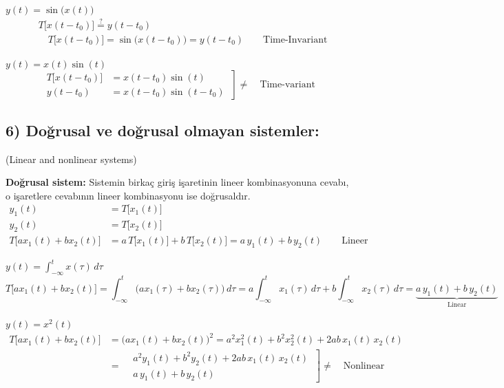 \documentclass[11pt,a4paper]{article}
\begin{document}
\begin{ornek}[(Ex)]
$y(t) = \sin\bigl(x(t)\bigr)$
\begin{align*}
  &T\bigl[x(t-t_0)\bigr] \overset{?}{=} y(t-t_0) \\
  &\quad T\bigl[x(t-t_0)\bigr] = \sin\bigl(x(t-t_0)\bigr) = y(t-t_0) \qquad \text{Time-Invariant}
\end{align*}
\end{ornek}

\begin{ornek}[(Ex)]
$y(t) = x(t)\sin(t)$
\[ \left.\begin{aligned}
  T\bigl[x(t-t_0)\bigr] &= x(t-t_0)\sin(t) \\
  y(t-t_0) &= x(t-t_0)\sin(t-t_0)
\end{aligned}\ \right]\neq \quad \text{Time-variant} \]
\end{ornek}

\subsection{6) Doğrusal ve doğrusal olmayan sistemler:}
(Linear and nonlinear systems)

\textbf{Doğrusal sistem:} Sistemin birkaç giriş işaretinin lineer kombinasyonuna cevabı, o işaretlere cevabının lineer kombinasyonu ise doğrusaldır.
\begin{align*}
  y_1(t) &= T\bigl[x_1(t)\bigr] \\
  y_2(t) &= T\bigl[x_2(t)\bigr] \\
  T\bigl[a x_1(t) + b x_2(t)\bigr] &= a\,T\bigl[x_1(t)\bigr] + b\,T\bigl[x_2(t)\bigr] = a\,y_1(t) + b\,y_2(t) \qquad \text{Lineer}
\end{align*}

\begin{ornek}[(Ex)]
$y(t) = \displaystyle\int_{-\infty}^{t} x(\tau)\,d\tau$
\[ T\bigl[a x_1(t) + b x_2(t)\bigr] = \int_{-\infty}^{t} \bigl(a x_1(\tau) + b x_2(\tau)\bigr)\,d\tau = a\int_{-\infty}^{t} x_1(\tau)\,d\tau + b\int_{-\infty}^{t} x_2(\tau)\,d\tau = \underbrace{a\,y_1(t) + b\,y_2(t)}_{\text{Linear}} \]
\end{ornek}

\begin{ornek}[(Ex)]
$y(t) = x^2(t)$
\begin{align*}
  T\bigl[a x_1(t) + b x_2(t)\bigr] &= \bigl(a x_1(t) + b x_2(t)\bigr)^2 = a^2 x_1^2(t) + b^2 x_2^2(t) + 2ab\,x_1(t)\,x_2(t) \\
  &= \left.\begin{aligned} &a^2 y_1(t) + b^2 y_2(t) + 2ab\,x_1(t)\,x_2(t) \\ &a\,y_1(t) + b\,y_2(t) \end{aligned}\ \right]\neq \quad \text{Nonlinear}
\end{align*}
\end{ornek}
\end{document}
